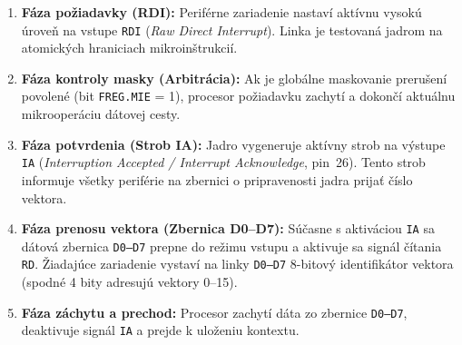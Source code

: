 \documentclass[11pt,a4paper]{article}
\newcommand{\reg}[1]{\texttt{#1}}
\begin{document}
\begin{enumerate}
  \item \textbf{Fáza požiadavky (RDI):} Periférne zariadenie nastaví aktívnu vysokú úroveň na vstupe \texttt{RDI} (\textit{Raw Direct Interrupt}). Linka je testovaná jadrom na atomických hraniciach mikroinštrukcií.
  \item \textbf{Fáza kontroly masky (Arbitrácia):} Ak je globálne maskovanie prerušení povolené (bit \reg{FREG.MIE} = 1), procesor požiadavku zachytí a dokončí aktuálnu mikrooperáciu dátovej cesty.
  \item \textbf{Fáza potvrdenia (Strob IA):} Jadro vygeneruje aktívny strob na výstupe \texttt{IA} (\textit{Interruption Accepted / Interrupt Acknowledge}, pin~26). Tento strob informuje všetky periférie na zbernici o pripravenosti jadra prijať číslo vektora.
  \item \textbf{Fáza prenosu vektora (Zbernica D0--D7):} Súčasne s aktiváciou \texttt{IA} sa dátová zbernica \texttt{D0--D7} prepne do režimu vstupu a aktivuje sa signál čítania \texttt{RD}. Žiadajúce zariadenie vystaví na linky \texttt{D0--D7} 8-bitový identifikátor vektora (spodné 4 bity adresujú vektory 0--15).
  \item \textbf{Fáza záchytu a prechod:} Procesor zachytí dáta zo zbernice \texttt{D0--D7}, deaktivuje signál \texttt{IA} a prejde k uloženiu kontextu.
\end{enumerate}
\end{document}
